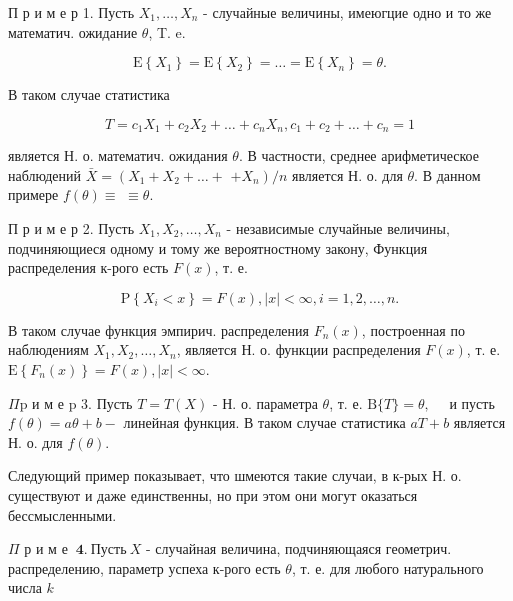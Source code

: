 \documentclass[10pt]{article}
\begin{document}
П р и м е р 1. Пусть $X_{1}, \ldots, X_{n}$ - случайные величины, имеюгцие одно и то же математич. ожидание $\theta$, T. e.



\[

\mathrm{E}\left\{X_{1}\right\}=\mathrm{E}\left\{X_{2}\right\}=\ldots=\mathrm{E}\left\{X_{n}\right\}=\theta .

\]



В таком случае статистика



\[

T=c_{1} X_{1}+c_{2} X_{2}+\ldots+c_{n} X_{n}, c_{1}+c_{2}+\ldots+c_{n}=1

\]



является Н. о. математич. ожидания $\theta$. В частности, среднее арифметическое наблюдений $\bar{X}=\left(X_{1}+X_{2}+\ldots+\right.$ $\left.+X_{n}\right) / n$ является Н. о. для $\theta$. В данном примере $f(\theta) \equiv$ $\equiv \theta$.



П р и м е р 2. Пусть $X_{1}, X_{2}, \ldots, X_{n}$ - независимые случайные величины, подчиняющиеся одному и тому же вероятностному закону, Функция распределения к-рого есть $F(x)$, т. е.



\[

\mathrm{P}\left\{X_{i}<x\right\}=F(x),|x|<\infty, i=1,2, \ldots, n .

\]



В таком случае функция эмпирич. распределения $F_{n}(x)$, построенная по наблюдениям $X_{1}, X_{2}, \ldots, X_{n}$, является Н. о. функции распределения $F(x)$, т. е. $\mathrm{E}\left\{F_{n}(x)\right\}=F(x),|x|<\infty$.



$\Pi \mathrm{p}$ и м е p 3. Пусть $T=T(X)$ - Н. о. параметра $\theta$, т. е. $\mathrm{B}\{T\}=\theta, \quad$ и пусть $f(\theta)=a \theta+b-$ линейная функция. В таком случае статистика $a T+b$ является Н. о. для $f(\theta)$.



Следующий пример показывает, что шмеются такие случаи, в к-рых Н. о. существуют и даже единственны, но при этом они могут оказаться бессмысленными.



$\Pi$ р и м е $\mathbf{~ 4 . ~ П у с т ь ~} X$ - случайная величина, подчиняющаяся геометрич. распределению, параметр успеха к-рого есть $\theta$, т. е. для любого натурального числа $k$
\end{document}
